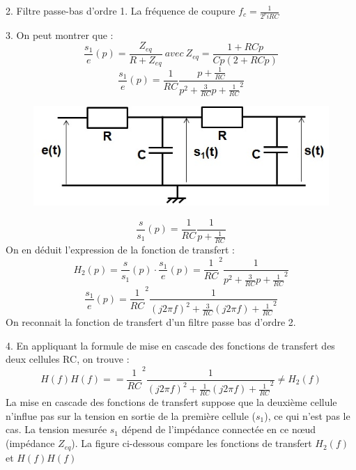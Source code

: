 \documentclass[11pt]{report}
\begin{document}
	2. Filtre passe-bas d'ordre 1. La fréquence de coupure $f_{c}=\frac{1}{2^pi RC}$
	
	3. On peut montrer que :
	\begin{equation*}
	\frac{s_{1}}{e}(p)=\frac{Z_{eq}}{R+Z_{eq}}~avec~Z_{eq}=\frac{1+RCp}{Cp(2+RCp)}
	\end{equation*}
	\begin{equation*}
	\frac{s_{1}}{e}(p)=\frac{1}{RC}\frac{p+\frac{1}{RC}}{p^{2}+\frac{3}{RC}p+\frac{1}{RC}^{2}}
	\end{equation*}
	
	\begin{figure}[h!]
		\centering
		\includegraphics[scale=0.5]{images/Cascade_filtre_RC_passe_bas.jpg} 
	\end{figure}

	\begin{equation*}
	\frac{s}{s_{1}}(p)=\frac{1}{RC}\frac{1}{p+\frac{1}{RC}}
	\end{equation*}
	On en déduit l'expression de la fonction de transfert :
	\begin{equation*}
	H_{2}(p)=\frac{s}{s_{1}}(p)\cdot \frac{s_{1}}{e}(p)=\frac{1}{RC}^{2}\frac{1}{p^{2}+\frac{3}{RC}p+\frac{1}{RC}^{2}}
	\end{equation*} 
	\begin{equation*}
	\frac{s_{1}}{e}(p)=\frac{1}{RC}^{2}\frac{1}{(j2\pi f)^{2}+\frac{3}{RC}(j2\pi f)+\frac{1}{RC}^{2}}
	\end{equation*}
	On reconnait la fonction de transfert d'un filtre passe bas d'ordre 2.
	
	4. En appliquant la formule de mise en cascade des fonctions de transfert des deux cellules RC, on trouve :
	\begin{equation*}
	H(f)H(f)==\frac{1}{RC}^{2}\frac{1}{(j2\pi f)^{2}+\frac{1}{RC}(j2\pi f)+\frac{1}{RC}^{2}} \neq H_{2}(f)
	\end{equation*}
	La mise en cascade des fonctions de transfert suppose que la deuxième cellule n'influe pas sur la tension en sortie de la première cellule ($s_{1}$), ce qui n'est pas le cas. La tension mesurée $s_{1}$ dépend de l'impédance connectée en ce nœud (impédance $Z_{eq}$). La figure ci-dessous compare les fonctions de transfert $H_{2}(f)$ et $H(f)H(f)$
	
\end{document}
